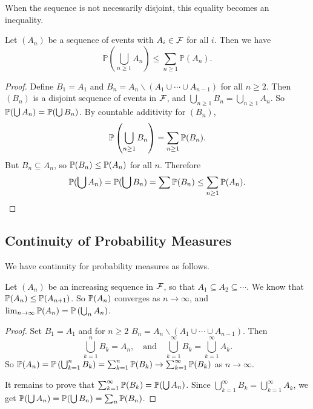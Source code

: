 \documentclass[a4paper]{scrreprt}
\begin{document}
When the sequence is not necessarily disjoint, this equality becomes an inequality. 

\begin{proposition}
	Let $(A_n)$ be a sequence of events with $A_i \in \mathcal{F}$ for all $i$. Then we have
	$$
	\mathbb{P}\left(\bigcup_{n \geq 1} A_{n}\right) \leq \sum_{n \geq 1} \mathbb{P}\left(A_{n}\right).
	$$
\end{proposition}
\begin{proof}
	Define $B_1 = A_1$ and $B_n = A_n \backslash (A_1 \cup \cdots \cup A_{n - 1})$ for all $n \geq 2$. Then $(B_n)$ is a disjoint sequence of events in $\mathcal{F}$, and $\bigcup_{n \geq 1} B_n = \bigcup_{n \geq 1} A_n$. So $\mathbb{P}(\bigcup A_n) = \mathbb{P}(\bigcup B_n)$. By countable additivity for $(B_n)$,
	$$
	\mathbb{P} \left(\bigcup_{n \geq 1} B_n\right) = \sum_{n \geq 1} \mathbb{P}(B_n).
	$$
	But $B_n \subseteq A_n$, so $\mathbb{P}(B_n) \leq \mathbb{P}(A_n)$ for all $n$. Therefore
	$$
	\mathbb{P}(\bigcup A_n) = \mathbb{P}(\bigcup B_n) = \sum \mathbb{P}(B_n) \leq \sum_{n \geq 1} \mathbb{P}(A_n).
	$$
\end{proof}

\subsection{Continuity of Probability Measures}

We have continuity for probability measures as follows.

\begin{proposition}
	Let $(A_n)$ be an increasing sequence in $\mathcal{F}$, 
	so that $A_1 \subseteq A_2 \subseteq \cdots$. 
	We know that $\mathbb{P}(A_n) \leq \mathbb{P}(A_{n + 1})$. 
	So $\mathbb{P}(A_n)$ converges as $n \rightarrow \infty$, and $\lim_{n \to \infty} \mathbb{P}(A_n) = \mathbb{P}\left(\bigcup_n A_n\right)$.
\end{proposition}
\begin{proof}
	Set $B_1 = A_1$ and for $n \geq 2$ $B_n = A_n \backslash (A_1 \cup \cdots \cup A_{n - 1})$. Then
	$$
	\bigcup_{k =1}^{n} B_k = A_n, \quad \text{and} \quad \bigcup_{k = 1}^\infty B_k = \bigcup_{k = 1}^{\infty} A_k.
	$$
	So $\mathbb{P}(A_n) = \mathbb{P}\left(\bigcup_{k = 1}^n B_k\right) = \sum_{k = 1}^n \mathbb{P}(B_k) \rightarrow \sum_{k = 1}^{\infty} \mathbb{P}(B_k)$ as $n \rightarrow \infty$.

	It remains to prove that $\sum_{k = 1}^{\infty} \mathbb{P}(B_k) = \mathbb{P}(\bigcup A_n)$. Since $\bigcup_{k = 1}^{\infty} B_k = \bigcup_{k = 1}^{\infty} A_k$, we get $\mathbb{P}(\bigcup A_n) = \mathbb{P}(\bigcup B_n) = \sum_n \mathbb{P}(B_n)$.
\end{proof}
\end{document}
